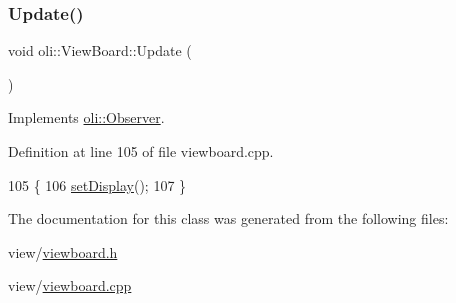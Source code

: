 \subsubsection{\texorpdfstring{Update()}{Update()}}
{\footnotesize\ttfamily void oli\+::\+View\+Board\+::\+Update (\begin{DoxyParamCaption}{ }\end{DoxyParamCaption})\hspace{0.3cm}{\ttfamily [virtual]}}



Implements \hyperlink{classoli_1_1_observer_a81154a42166f88a6e341909438a07b75}{oli\+::\+Observer}.



Definition at line 105 of file viewboard.\+cpp.


\begin{DoxyCode}
105                       \{
106     \hyperlink{classoli_1_1_view_board_a0f9e3b18dfb6f2224bef1b73ce8b3929}{setDisplay}();
107 \}
\end{DoxyCode}


The documentation for this class was generated from the following files\+:\begin{DoxyCompactItemize}
\item 
view/\hyperlink{viewboard_8h}{viewboard.\+h}\item 
view/\hyperlink{viewboard_8cpp}{viewboard.\+cpp}\end{DoxyCompactItemize}
